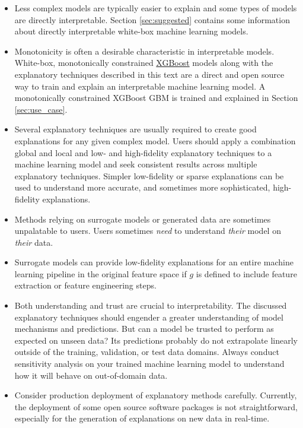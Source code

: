 \documentclass[11pt]{asaproc}
\begin{document}
\begin{itemize}	
	
	\item Less complex models are typically easier to explain and some types of models are directly interpretable. Section \ref{sec:suggested} contains some information about directly interpretable white-box machine learning models.
	
	\item Monotonicity is often a desirable characteristic in interpretable models. White-box, monotonically constrained \href{https://github.com/dmlc/xgboost}{XGBoost} models along with the explanatory techniques described in this text are a direct and open source way to train and explain an interpretable machine learning model. A monotonically constrained XGBoost GBM is trained and explained in Section \ref{sec:use_case}.
	
	\item Several explanatory techniques are usually required to create good explanations for any given complex model. Users should apply a combination global and local and low- and high-fidelity explanatory techniques to a machine learning model and seek consistent results across multiple explanatory techniques. Simpler low-fidelity or sparse explanations can be used to understand more accurate, and sometimes more sophisticated, high-fidelity explanations.  

	\item Methods relying on surrogate models or generated data are sometimes unpalatable to users. Users sometimes \textit{need} to understand \textit{their} model on \textit{their} data.
	
	\item Surrogate models can provide low-fidelity explanations for an entire machine learning pipeline in the original feature space if $g$ is defined to include feature extraction or feature engineering steps.
	
	\item Both understanding and trust are crucial to interpretability. The discussed explanatory techniques should engender a greater understanding of model mechanisms and predictions. But can a model be trusted to perform as expected on unseen data? Its predictions probably do not extrapolate linearly outside of the training, validation, or test data domains. Always conduct sensitivity analysis on your trained machine learning model to understand how it will behave on out-of-domain data.
	
	\item Consider production deployment of explanatory methods carefully. Currently, the deployment of some open source software packages is not straightforward, especially for the generation of explanations on new data in real-time.
	
\end{itemize}
\end{document}
